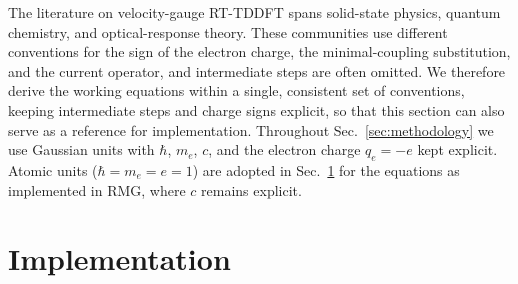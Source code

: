 \documentclass[journal=jctcce,manuscript=article,etalmode=truncate,maxauthors=10,layout=onecolumn]{achemso}
\begin{document}
The literature on velocity-gauge RT-TDDFT spans solid-state physics, quantum
chemistry, and optical-response theory. These communities use different
conventions for the sign of the electron charge, the minimal-coupling
substitution, and the current operator, and intermediate steps are often
omitted. We therefore derive the working equations within a single, consistent
set of conventions, keeping intermediate steps and charge signs explicit, so
that this section can also serve as a reference for implementation. Throughout
Sec.~\ref{sec:methodology} we use Gaussian units with $\hbar$, $m_e$, $c$, and
the electron charge $q_e = -e$ kept explicit. Atomic units
($\hbar = m_e = e = 1$) are adopted in Sec.~\ref{sec:implementation} for the
equations as implemented in RMG, where $c$ remains explicit.





%
%









\section{Implementation} %
\label{sec:implementation}



%
%
%



\end{document}
